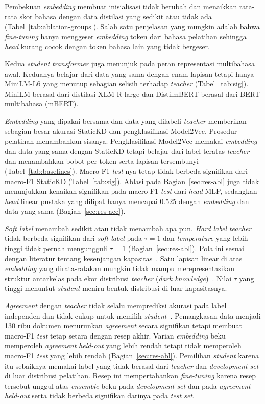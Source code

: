 \documentclass{ieeeaccess}
\newcommand{\en}[1]{\textit{#1}}
\begin{document}
Pembekuan \en{embedding} membuat inisialisasi tidak berubah dan menaikkan rata-rata skor bahasa dengan data distilasi yang sedikit atau tidak ada (Tabel~\ref{tab:ablation-groups}). Salah satu penjelasan yang mungkin adalah bahwa \en{fine-tuning} hanya menggeser \en{embedding} token dari bahasa pelatihan sehingga \en{head} kurang cocok dengan token bahasa lain yang tidak bergeser.

Kedua \en{student} \en{transformer} juga menunjuk pada peran representasi multibahasa awal. Keduanya belajar dari data yang sama dengan enam lapisan tetapi hanya MiniLM-L6 yang menutup sebagian selisih terhadap \en{teacher} (Tabel~\ref{tab:sig}). MiniLM berasal dari distilasi XLM-R-large dan DistilmBERT berasal dari BERT multibahasa (mBERT).

\en{Embedding} yang dipakai bersama dan data yang dilabeli \en{teacher} memberikan sebagian besar akurasi StaticKD dan pengklasifikasi Model2Vec. Prosedur pelatihan menambahkan sisanya. Pengklasifikasi Model2Vec memakai \en{embedding} dan data yang sama dengan StaticKD tetapi belajar dari label teratas \en{teacher} dan menambahkan bobot per token serta lapisan tersembunyi (Tabel~\ref{tab:baselines}). Macro-F1 \en{test}-nya tetap tidak berbeda signifikan dari macro-F1 StaticKD (Tabel~\ref{tab:sig}). Ablasi pada Bagian~\ref{sec:res-abl} juga tidak menunjukkan kenaikan signifikan pada macro-F1 \en{test} dari \en{head} MLP, sedangkan \en{head} linear pustaka yang dilipat hanya mencapai 0.525 dengan \en{embedding} dan data yang sama (Bagian~\ref{sec:res-acc}).

\en{Soft label} menambah sedikit atau tidak menambah apa pun. \en{Hard label} \en{teacher} tidak berbeda signifikan dari \en{soft label} pada $\tau=1$ dan \en{temperature} yang lebih tinggi tidak pernah mengungguli $\tau=1$ (Bagian~\ref{sec:res-abl}). Pola ini sesuai dengan literatur tentang kesenjangan kapasitas~\cite{zhang2025law,wang2026rckd}. Satu lapisan linear di atas \en{embedding} yang dirata-ratakan mungkin tidak mampu merepresentasikan struktur antarkelas pada ekor distribusi \en{teacher} (\en{dark knowledge})~\cite{zhao2022dkd}. Nilai $\tau$ yang tinggi menuntut \en{student} meniru bentuk distribusi di luar kapasitasnya.

\en{Agreement} dengan \en{teacher} tidak selalu memprediksi akurasi pada label independen dan tidak cukup untuk memilih \en{student}~\cite{stanton2021kd}. Pemangkasan data menjadi 130 ribu dokumen menurunkan \en{agreement} secara signifikan tetapi membuat macro-F1 \en{test} tetap setara dengan resep akhir. Varian \en{embedding} beku memperoleh \en{agreement} \en{held-out} yang lebih rendah tetapi tidak memperoleh macro-F1 \en{test} yang lebih rendah (Bagian~\ref{sec:res-abl}). Pemilihan \en{student} karena itu sebaiknya memakai label yang tidak berasal dari \en{teacher} dan \en{development set} di luar distribusi pelatihan. Resep ini mempertahankan \en{fine-tuning} karena resep tersebut unggul atas \en{ensemble} beku pada \en{development set} dan pada \en{agreement} \en{held-out} serta tidak berbeda signifikan darinya pada \en{test set}.
\end{document}
